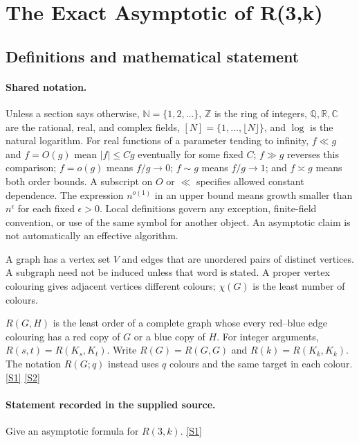 \documentclass[11pt,a4paper]{article}
\newcommand{\N}{\mathbb{N}}
\newcommand{\Z}{\mathbb{Z}}
\newcommand{\Q}{\mathbb{Q}}
\newcommand{\R}{\mathbb{R}}
\newcommand{\C}{\mathbb{C}}
\newcommand{\sref}[2]{\hyperlink{source:#1:#2}{[S#2]}}
\begin{document}
\section{The Exact Asymptotic of R(3,k)}\label{statement}


\subsection{Definitions and mathematical statement}

\paragraph{Shared notation.}Unless a section says otherwise, $\N=\{1,2,\ldots\}$,
$\Z$ is the ring of integers, $\Q,\R,\C$ are the rational, real, and complex
fields, $[N]=\{1,\ldots,\lfloor N\rfloor\}$, and $\log$ is the natural
logarithm. For real functions of a parameter tending to infinity,
$f\ll g$ and $f=O(g)$ mean $|f|\leq Cg$ eventually for some fixed $C$;
$f\gg g$ reverses this comparison; $f=o(g)$ means $f/g\to0$;
$f\sim g$ means $f/g\to1$; and $f\asymp g$ means both order bounds.
A subscript on $O$ or $\ll$ specifies allowed constant dependence.
The expression $n^{o(1)}$ in an upper bound means growth smaller than
$n^\epsilon$ for each fixed $\epsilon>0$. Local definitions govern any
exception, finite-field convention, or use of the same symbol for another
object. An asymptotic claim is not automatically an effective algorithm.



A graph has a vertex set $V$ and edges that are unordered pairs of distinct vertices. A subgraph need not be induced unless that word is stated. A proper vertex colouring gives adjacent vertices different colours; $\chi(G)$ is the least number of colours.

$R(G,H)$ is the least order of a complete graph whose every red--blue edge colouring has a red copy of $G$ or a blue copy of $H$. For integer arguments, $R(s,t)=R(K_s,K_t)$. Write $R(G)=R(G,G)$ and $R(k)=R(K_k,K_k)$. The notation $R(G;q)$ instead uses $q$ colours and the same target in each colour. \sref{statement}{1} \sref{statement}{2}

\paragraph{Statement recorded in the supplied source.}
Give an asymptotic formula for $R(3,k)$. \sref{statement}{1}
\end{document}
